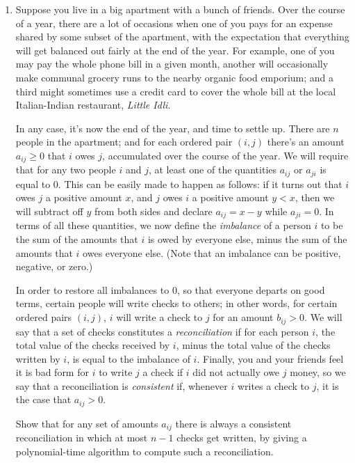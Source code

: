 \documentclass[12pt]{article}
\begin{document}
\begin{enumerate}
{}



\item 

Suppose you live in a big apartment with a bunch of friends.
Over the course of a year, there are a lot of occasions
when one of you pays for an expense shared by some subset of the apartment,
with the expectation that everything will get balanced out fairly
at the end of the year.
For example, one of you may pay the whole phone bill in a given month,
another will occasionally make communal grocery runs to the nearby
organic food emporium; and a third might sometimes use a
credit card to cover the whole bill at the local
Italian-Indian restaurant, {\em Little Idli}.

In any case, it's now the end of the year, and time to settle up.
There are $n$ people in the apartment; and for
each ordered pair
$(i,j)$ there's an amount $a_{ij} \geq 0$ that $i$ owes $j$,
accumulated over the course of the year.
We will require that for any two people $i$ and $j$,
at least one of the quantities $a_{ij}$ or $a_{ji}$ is equal to $0$.
This can be easily made to happen as follows:
if it turns out that $i$ owes $j$ a positive amount $x$,
and $j$ owes $i$ a positive amount $y < x$, then we will
subtract off $y$ from both sides and declare $a_{ij} = x - y$
while $a_{ji} = 0$.
In terms of all these quantities, we now define the
{\em imbalance} of a person $i$ to be the sum of
the amounts that $i$ is owed by everyone else,
minus the sum of the amounts that $i$ owes everyone else.
(Note that an imbalance can be positive, negative, or zero.)

In order to restore all imbalances to $0$,
so that everyone departs on good terms,
certain people will write checks to others;
in other words, for certain ordered pairs $(i,j)$,
$i$ will write a check to $j$ for an amount $b_{ij} > 0$.
We will say that a set of checks constitutes a
{\em reconciliation} if for each person $i$,
the total value of the checks received by $i$,
minus the total value of the checks written by $i$,
is equal to the imbalance of $i$.
Finally, you and your friends feel it is bad form
for $i$ to write $j$ a check if $i$ did not actually
owe $j$ money, so we say that a reconciliation
is {\em consistent} if, whenever $i$ writes a check to $j$,
it is the case that $a_{ij} > 0$.

Show that for any set of amounts $a_{ij}$ there is
always a consistent reconciliation in which at most $n-1$ checks get written,
by giving a polynomial-time algorithm to compute such
a reconciliation.


\end{enumerate}
\end{document}
